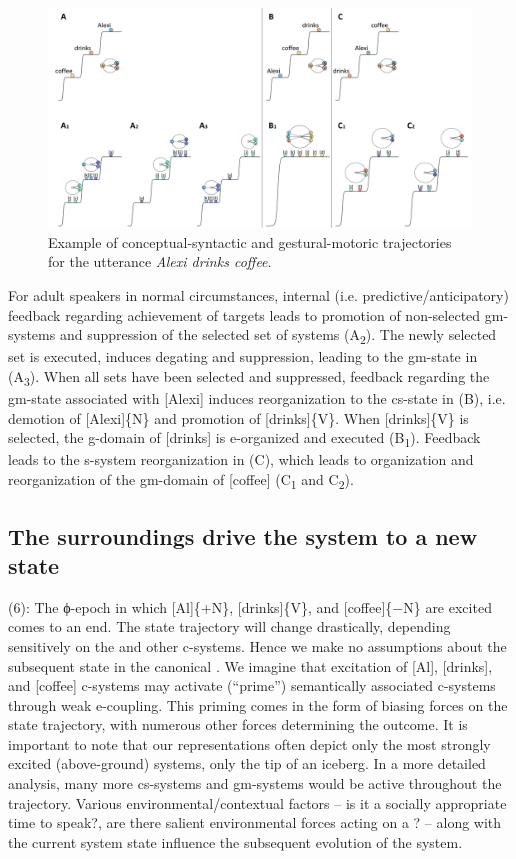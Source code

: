   
\begin{figure}
\includegraphics[width=\textwidth]{figures/Tilsen-img55.png}
\caption{Example of conceptual-syntactic and gestural-motoric trajectories for the utterance \textit{Alexi drinks coffee}.}
\label{fig:4:5}
\end{figure}
 

For adult speakers in normal circumstances, internal (i.e. predictive/anticipatory) feedback regarding achievement of  targets leads to promotion of non-selected gm-systems and suppression of the selected set of systems (A\textsubscript{2}). The newly selected set is executed,  induces degating and suppression, leading to the gm-state in (A\textsubscript{3}). When all sets have been selected and suppressed, feedback regarding the gm-state associated with [Alexi] induces reorganization to the cs-state in (B), i.e. demotion of [Alexi]\{N\} and promotion of [drinks]\{V\}. When [drinks]\{V\} is selected, the g-domain of [drinks] is e-organized and executed (B\textsubscript{1}). Feedback leads to the s-system reorganization in (C), which leads to organization and reorganization of the gm-domain of [coffee] (C\textsubscript{1} and C\textsubscript{2}).

\subsection{The surroundings drive the system to a new state}

(6): The ϕ-epoch in which [Al]\{+N\}, [drinks]\{V\}, and [coffee]\{−N\} are excited comes to an end. The state trajectory will change drastically, depending sensitively on the  and other c-systems. Hence we make no assumptions about the subsequent state in the canonical . We imagine that excitation of [Al], [drinks], and [coffee] c-systems may activate (“prime”) semantically associated c-systems through weak e-coupling. This priming comes in the form of biasing forces on the state trajectory, with numerous other  forces determining the outcome. It is important to note that our representations often depict only the most strongly excited (above-ground) systems, only the tip of an iceberg. In a more detailed analysis, many more cs-systems and gm-systems would be active throughout the trajectory. Various environmental/contextual factors -- is it a socially appropriate time to speak?, are there salient environmental forces acting on a ? -- along with the current system state influence the subsequent evolution of the system. 

